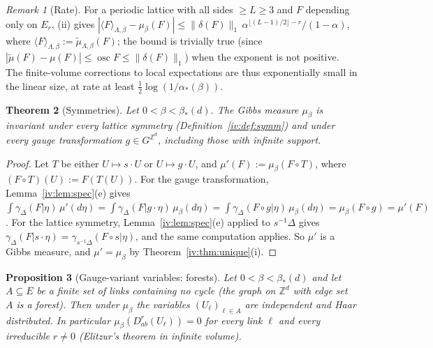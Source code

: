 \documentclass[11pt,a4paper]{article}
\newtheorem{theorem}{Theorem}[section]
\newtheorem{proposition}[theorem]{Proposition}
\theoremstyle{definition}
\theoremstyle{remark}
\newtheorem{remark}[theorem]{Remark}
\DeclareMathOperator{\osc}{osc}
\newcommand{\Z}{\mathbb{Z}}
\newcommand{\norm}[1]{\lVert #1\rVert}
\newcommand{\aS}{\alpha_*}
\newcommand{\bS}{\beta_*}
\begin{document}
\begin{remark}[Rate]
For a periodic lattice with all sides $\ge L\ge3$ and $F$ depending only on $E_r$, (ii) gives
$|\langle F\rangle_{\Lambda,\beta}-\mu_\beta(F)|\le\norm{\delta(F)}_1\,\alpha^{\lfloor(L-1)/2\rfloor-r}/(1-\alpha)$, where
$\langle F\rangle_{\Lambda,\beta}:=\tilde\mu_{\Lambda,\beta}(F)$; the bound is trivially true (since
$|\tilde\mu(F)-\mu(F)|\le\osc F\le\norm{\delta(F)}_1$) when the exponent is not positive. The finite-volume corrections to
local expectations are thus exponentially small in the linear size, at rate at least $\frac12\log(1/\aS(\beta))$.
\end{remark}

\begin{theorem}[Symmetries]\label{iv:thm:symm}
Let $0<\beta<\bS(d)$. The Gibbs measure $\mu_\beta$ is invariant under every lattice symmetry (Definition~\ref{iv:def:symm}) and
under every gauge transformation $g\in G^{\Z^d}$, including those with infinite support.
\end{theorem}

\begin{proof}
Let $T$ be either $U\mapsto s\cdot U$ or $U\mapsto g\cdot U$, and $\mu'(F):=\mu_\beta(F\circ T)$, where $(F\circ T)(U):=F(T(U))$.
For the gauge transformation, Lemma~\ref{iv:lem:spec}(e) gives
$\int\gamma_\Delta(F|\eta)\,\mu'(d\eta)=\int\gamma_\Delta(F|g\cdot\eta)\,\mu_\beta(d\eta)=\int\gamma_\Delta(F\circ g|\eta)\,\mu_\beta(d\eta)
=\mu_\beta(F\circ g)=\mu'(F)$. For the lattice symmetry, Lemma~\ref{iv:lem:spec}(e) applied to $s^{-1}\Delta$ gives
$\gamma_\Delta(F|s\cdot\eta)=\gamma_{s^{-1}\Delta}(F\circ s|\eta)$, and the same computation applies. So $\mu'$ is a Gibbs measure,
and $\mu'=\mu_\beta$ by Theorem~\ref{iv:thm:unique}(i).
\end{proof}

\begin{proposition}[Gauge-variant variables: forests]\label{iv:prop:forest}
Let $0<\beta<\bS(d)$ and let $A\subseteq E$ be a finite set of links containing no cycle (the graph on $\Z^d$ with edge set $A$ is a
forest). Then under $\mu_\beta$ the variables $(U_\ell)_{\ell\in A}$ are independent and Haar distributed. In particular
$\mu_\beta(D^r_{ab}(U_\ell))=0$ for every link $\ell$ and every irreducible $r\neq0$ (Elitzur's theorem in infinite volume).
\end{proposition}
\end{document}
